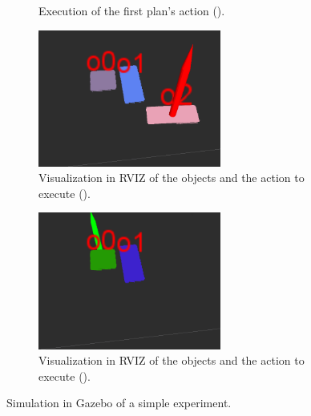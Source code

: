 \begin{figure}
\begin{subfigure}[h]{0.45\textwidth}
\caption{Execution of the first plan's action ().}\label{fig:sim_push}
\end{subfigure}
\begin{subfigure}[h]{0.45\textwidth}
\centering
\includegraphics[width=6cm]{Img/simulation/action2.png}
\caption{Visualization in RVIZ of the objects and the action to execute ().}\label{fig:action2}
\end{subfigure}
\begin{subfigure}[h]{0.45\textwidth}
\centering
\includegraphics[width=6cm]{Img/simulation/action3.png}
\caption{Visualization in RVIZ of the objects and the action to execute ().}\label{fig:action3}
\end{subfigure}
\caption{Simulation in Gazebo of a simple experiment.}\label{fig:simulation}
\end{figure}